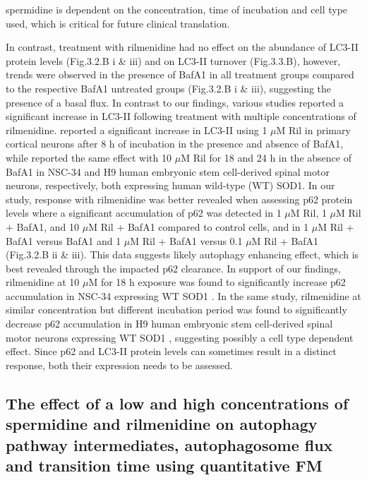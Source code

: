 {spermidine is dependent on the concentration, time of incubation and cell type used, which is critical for future clinical translation.

In contrast, treatment with rilmenidine had no effect on the abundance of LC3-II protein levels (Fig.3.2.B i \& iii) and on LC3-II turnover (Fig.3.3.B), however, trends were observed in the presence of BafA1 in all treatment groups compared to the respective BafA1 untreated groups (Fig.3.2.B i \& iii), suggesting the presence of a basal flux.  In contrast to our findings, various studies reported a significant increase in LC3-II following treatment with multiple concentrations of rilmenidine. \citet{Rose2010} reported a significant increase in LC3-II using 1 $\mu$M Ril in primary cortical neurons after 8 h of incubation in the presence and absence of BafA1, while \citet{Perera2018} reported the same effect with 10 $\mu$M Ril for 18 and 24 h  in the absence of BafA1 in NSC-34 and H9 human embryonic stem cell-derived spinal motor neurons, respectively, both expressing human wild-type (WT) SOD1. In our study, response with rilmenidine was better revealed when assessing p62 protein levels where a significant accumulation of p62 was detected in 1 $\mu$M Ril, 1 $\mu$M Ril + BafA1, and 10 $\mu$M Ril + BafA1 compared to control cells, and in 1 $\mu$M Ril + BafA1 versus BafA1 and 1 $\mu$M Ril + BafA1 versus 0.1 $\mu$M Ril + BafA1 (Fig.3.2.B ii \& iii). This data suggests likely autophagy enhancing effect, which is best revealed through the impacted p62 clearance. In support of our findings, rilmenidine at 10 $\mu$M for 18 h exposure was found to significantly increase p62 accumulation in NSC-34 expressing WT SOD1 \citep{Perera2018}. In the same study, rilmenidine at similar concentration but different incubation period was found to significantly decrease p62 accumulation in H9 human embryonic stem cell-derived spinal motor neurons expressing WT SOD1  \citep{Perera2018}, suggesting possibly a cell type dependent effect. Since p62 and LC3-II protein levels can sometimes result in a distinct response, both their expression needs to be assessed.

\subsection{The effect of a low and high concentrations of spermidine and rilmenidine on autophagy pathway intermediates, autophagosome flux and transition time using quantitative FM}

}
